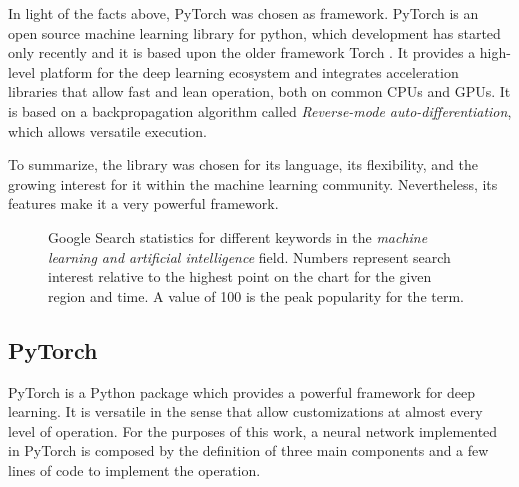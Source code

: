 In light of the facts above, PyTorch was chosen as framework.
PyTorch is an open source machine learning library for python, which development has started only recently and it is based upon the older framework Torch  \cite{PyTorch.org}.
It provides a high-level platform for the deep learning ecosystem and integrates acceleration libraries that allow fast and lean operation, both on common \acsp{CPU} and \acsp{GPU}.
It is based on a backpropagation algorithm called \textit{Reverse-mode auto-differentiation}, which allows versatile execution.

To summarize, the library was chosen for its language, its flexibility, and the growing interest for it within the machine learning community.
Nevertheless, its features make it a very powerful framework.

\begin{figure}[htbp]
	\centering
	
	\caption{Google Search statistics for different keywords in the \textit{machine learning and artificial intelligence} field.
		Numbers represent search interest relative to the highest point on the chart for the given region and time.
		A value of 100 is the peak popularity for the term.}
	\label{fig:GoogleTrendsPyTorch}
\end{figure}


\subsection{PyTorch}
\label{ssec:PyTorch}
PyTorch is a Python package which provides a powerful framework for deep learning.
It is versatile in the sense that allow customizations at almost every level of operation.
For the purposes of this work, a neural network implemented in PyTorch is composed by the definition of three main components and a few lines of code to implement the operation.

